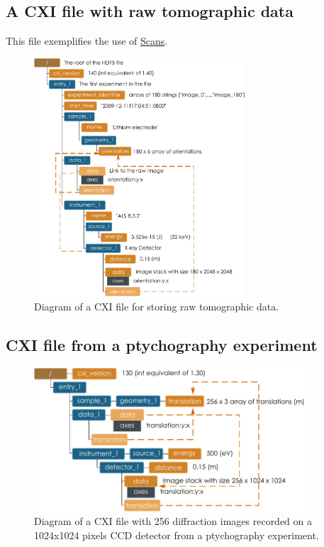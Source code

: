 \documentclass[usletter,11pt]{article}
\begin{document}
\clearpage

\subsection{A CXI file with raw tomographic data}

This file exemplifies the use of \hyperref[sec:scans]{Scans}.

\begin{figure}[h!]
\centering
\includegraphics[width=0.7\textwidth]{tomography_cxi.pdf}
\caption{Diagram of a CXI file for storing raw tomographic data.}
\label{fig:tomography_raw_example}
\end{figure}

\clearpage

\subsection{CXI file from a ptychography experiment}

\begin{figure}[h!]
\centering
\includegraphics[width=0.9\textwidth]{ptychography_cxi.pdf}
\caption{Diagram of a CXI file with 256 diffraction images recorded on
  a 1024x1024 pixels CCD detector from a ptychography experiment.}
\label{fig:ptychography_cxi}
\end{figure}
\end{document}

